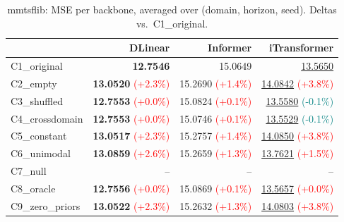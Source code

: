 \begin{table}[t]
\caption{mmtsflib: MSE per backbone, averaged over (domain, horizon, seed). Deltas vs.\ C1\_original.}
\label{tab:bb_mmtsflib}
\centering
\small
\begin{tabular}{lrrr}
\toprule
 & DLinear & Informer & iTransformer \\
\midrule
C1\_original & \textbf{12.7546} & 15.0649 & \underline{13.5650} \\
C2\_empty & \textbf{13.0520} {\tiny \textcolor{red}{(+2.3\%)}} & 15.2690 {\tiny \textcolor{red}{(+1.4\%)}} & \underline{14.0842} {\tiny \textcolor{red}{(+3.8\%)}} \\
C3\_shuffled & \textbf{12.7553} {\tiny \textcolor{red}{(+0.0\%)}} & 15.0824 {\tiny \textcolor{red}{(+0.1\%)}} & \underline{13.5580} {\tiny \textcolor{teal}{(-0.1\%)}} \\
C4\_crossdomain & \textbf{12.7553} {\tiny \textcolor{red}{(+0.0\%)}} & 15.0746 {\tiny \textcolor{red}{(+0.1\%)}} & \underline{13.5529} {\tiny \textcolor{teal}{(-0.1\%)}} \\
C5\_constant & \textbf{13.0517} {\tiny \textcolor{red}{(+2.3\%)}} & 15.2757 {\tiny \textcolor{red}{(+1.4\%)}} & \underline{14.0850} {\tiny \textcolor{red}{(+3.8\%)}} \\
C6\_unimodal & \textbf{13.0859} {\tiny \textcolor{red}{(+2.6\%)}} & 15.2659 {\tiny \textcolor{red}{(+1.3\%)}} & \underline{13.7621} {\tiny \textcolor{red}{(+1.5\%)}} \\
C7\_null & -- & -- & -- \\
C8\_oracle & \textbf{12.7556} {\tiny \textcolor{red}{(+0.0\%)}} & 15.0869 {\tiny \textcolor{red}{(+0.1\%)}} & \underline{13.5657} {\tiny \textcolor{red}{(+0.0\%)}} \\
C9\_zero\_priors & \textbf{13.0522} {\tiny \textcolor{red}{(+2.3\%)}} & 15.2632 {\tiny \textcolor{red}{(+1.3\%)}} & \underline{14.0803} {\tiny \textcolor{red}{(+3.8\%)}} \\
\bottomrule
\end{tabular}
\end{table}
